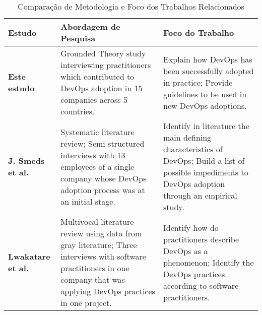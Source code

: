 \begin{table}[hb!]
\centering
\caption{Comparação de Metodologia e Foco dos Trabalhos Relacionados}
\label{related_work_table}
\begin{tabular}{|p{3cm}|p{6cm}|p{6cm}|}
\hline

\textbf{Estudo}
& \textbf{Abordagem de Pesquisa}
& \textbf{Foco do Trabalho} \\

\hline

\textbf{Este estudo}

& Grounded Theory study interviewing practitioners which contributed to DevOps
adoption in 15 companies across 5 countries.

& Explain how DevOps has been successfully adopted in practice;\newline
\newline Provide guidelines to be used in new DevOps adoptions. \\

\hline

\textbf{J. Smeds et al.~\cite{devops_a_definition}}

& Systematic literature review; \newline \newline Semi structured interviews
with 13 employees of a single company whose DevOps adoption process was at
an initial stage.

& Identify in literature the main defining characteristics of DevOps; \newline
\newline Build a list of possible impediments to DevOps adoption through an
empirical study. \\

\hline

\textbf{Lwakatare et al.~\cite{extending_dimensions}}

&
Multivocal literature review using data from gray literature; \newline \newline
Three interviews with software practitioners in one company that was applying
DevOps practices in one project.

& Identify how do practitioners describe DevOps as a phenomenon; \newline
\newline Identify the DevOps practices according to software practitioners. \\

\hline


\end{tabular}
\end{table}
